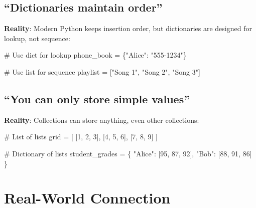 \documentclass[
  letterpaper,
  DIV=11,
  numbers=noendperiod,
  oneside]{scrreprt}
\newenvironment{Shaded}{}{}
\newcommand{\CommentTok}[1]{\textcolor[rgb]{0.42,0.45,0.49}{#1}}
\newcommand{\DecValTok}[1]{\textcolor[rgb]{0.00,0.36,0.77}{#1}}
\newcommand{\NormalTok}[1]{\textcolor[rgb]{0.14,0.16,0.18}{#1}}
\newcommand{\OperatorTok}[1]{\textcolor[rgb]{0.14,0.16,0.18}{#1}}
\newcommand{\StringTok}[1]{\textcolor[rgb]{0.01,0.18,0.38}{#1}}
\begin{document}
\subsection{``Dictionaries maintain
order''}\label{dictionaries-maintain-order}

\textbf{Reality}: Modern Python keeps insertion order, but dictionaries
are designed for lookup, not sequence:

\begin{Shaded}
\begin{Highlighting}[]
\CommentTok{\# Use dict for lookup}
\NormalTok{phone\_book }\OperatorTok{=}\NormalTok{ \{}\StringTok{"Alice"}\NormalTok{: }\StringTok{"555{-}1234"}\NormalTok{\}}

\CommentTok{\# Use list for sequence}
\NormalTok{playlist }\OperatorTok{=}\NormalTok{ [}\StringTok{"Song 1"}\NormalTok{, }\StringTok{"Song 2"}\NormalTok{, }\StringTok{"Song 3"}\NormalTok{]}
\end{Highlighting}
\end{Shaded}

\subsection{``You can only store simple
values''}\label{you-can-only-store-simple-values}

\textbf{Reality}: Collections can store anything, even other
collections:

\begin{Shaded}
\begin{Highlighting}[]
\CommentTok{\# List of lists}
\NormalTok{grid }\OperatorTok{=}\NormalTok{ [}
\NormalTok{    [}\DecValTok{1}\NormalTok{, }\DecValTok{2}\NormalTok{, }\DecValTok{3}\NormalTok{],}
\NormalTok{    [}\DecValTok{4}\NormalTok{, }\DecValTok{5}\NormalTok{, }\DecValTok{6}\NormalTok{],}
\NormalTok{    [}\DecValTok{7}\NormalTok{, }\DecValTok{8}\NormalTok{, }\DecValTok{9}\NormalTok{]}
\NormalTok{]}

\CommentTok{\# Dictionary of lists}
\NormalTok{student\_grades }\OperatorTok{=}\NormalTok{ \{}
    \StringTok{"Alice"}\NormalTok{: [}\DecValTok{95}\NormalTok{, }\DecValTok{87}\NormalTok{, }\DecValTok{92}\NormalTok{],}
    \StringTok{"Bob"}\NormalTok{: [}\DecValTok{88}\NormalTok{, }\DecValTok{91}\NormalTok{, }\DecValTok{86}\NormalTok{]}
\NormalTok{\}}
\end{Highlighting}
\end{Shaded}

\section{Real-World Connection}\label{real-world-connection-6}
\end{document}
